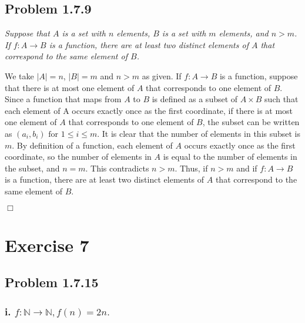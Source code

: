 \documentclass[
]{article}
\begin{document}
\hypertarget{problem-1.7.9}{%
\subsection{Problem 1.7.9}\label{problem-1.7.9}}

\emph{Suppose that \(A\) is a set with \(n\) elements, \(B\) is a set
with \(m\) elements, and \(n>m\). If \(f: A \rightarrow B\) is a
function, there are at least two distinct elements of \(A\) that
correspond to the same element of \(B\).}

We take \(|A| = n\), \(|B| = m\) and \(n>m\) as given. If
\(f: A \rightarrow B\) is a function, suppose that there is at most one
element of \(A\) that corresponds to one element of \(B\). Since a
function that maps from \(A\) to \(B\) is defined as a subset of
\(A \times B\) such that each element of A occurs exactly once as the
first coordinate, if there is at most one element of \(A\) that
corresponds to one element of \(B\), the subset can be written as
\({(a_i, b_i) \text{ for }1 \leq i \leq m}\). It is clear that the
number of elements in this subset is \(m\). By definition of a function,
each element of \(A\) occurs exactly once as the first coordinate, so
the number of elements in \(A\) is equal to the number of elements in
the subset, and \(n=m\). This contradicts \(n>m\). Thus, if \(n>m\) and
if \(f: A \rightarrow B\) is a function, there are at least two distinct
elements of \(A\) that correspond to the same element of \(B\).

\hfill \(\Box\)

\hypertarget{exercise-7}{%
\section{Exercise 7}\label{exercise-7}}

\hypertarget{problem-1.7.15}{%
\subsection{Problem 1.7.15}\label{problem-1.7.15}}

\hypertarget{i.-fmathbbn-rightarrow-mathbbn-fn-2n.}{%
\subsubsection{\texorpdfstring{i.
\(f:\mathbb{N} \rightarrow \mathbb{N}, f(n) = 2n.\)}{i. f:\textbackslash mathbb\{N\} \textbackslash rightarrow \textbackslash mathbb\{N\}, f(n) = 2n.}}\label{i.-fmathbbn-rightarrow-mathbbn-fn-2n.}}
\end{document}
